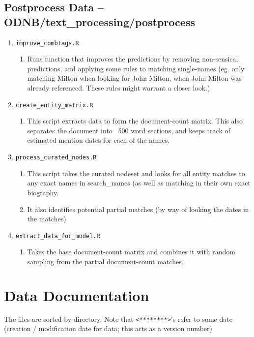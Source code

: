 \documentclass[11pt]{article}
\newcommand{\filename}[1]{\texttt{#1}}
\begin{document}
\subsection{Postprocess Data -- ODNB/text\_processing/postprocess}
\begin{enumerate}

\item \filename{improve\_combtags.R}
\begin{enumerate}
\item Runs function that improves the predictions by removing non-sensical predictions, and applying some rules to matching single-names (eg. only matching Milton when looking for John Milton, when John Milton was already referenced. These rules might warrant a closer look.)

\end{enumerate}

\item \filename{create\_entity\_matrix.R}
\begin{enumerate}
\item This script extracts data to form the document-count matrix. This also separates the document into ~500 word sections, and keeps track of estimated mention dates for each of the names. 
\end{enumerate}

\item \filename{process\_curated\_nodes.R}
\begin{enumerate}
\item This script takes the curated nodeset and looks for all entity matches to any exact names in search\_names (as well as matching in their own exact biography. 
\item It also identifies potential partial matches (by way of looking the dates in the matches)
\end{enumerate}


\item \filename{extract\_data\_for\_model.R}

\begin{enumerate}
\item Takes the base document-count matrix and combines it with random sampling from the partial document-count matches. 
\end{enumerate}

\end{enumerate}




\section{Data Documentation}
The files are sorted by directory. Note that \texttt{<********>}'s refer to some date (creation / modification date for data; this acts as a version number)
\end{document}
